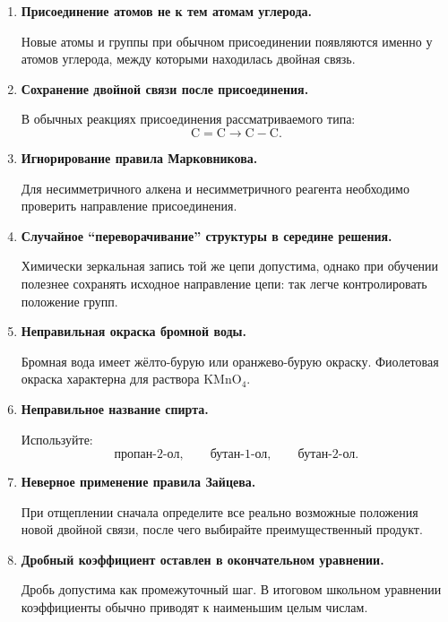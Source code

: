 \documentclass[a4paper,12pt]{article}
\newcommand{\important}[1]{\textbf{\textcolor{darkaccent}{#1}}}
\begin{document}
\begin{enumerate}
    \item \important{Присоединение атомов не к тем атомам углерода.}

    Новые атомы и группы при обычном присоединении появляются именно у атомов углерода, между которыми находилась двойная связь.

    \item \important{Сохранение двойной связи после присоединения.}

    В обычных реакциях присоединения рассматриваемого типа:
    \[
    \mathrm{C=C}\longrightarrow\mathrm{C-C}.
    \]

    \item \important{Игнорирование правила Марковникова.}

    Для несимметричного алкена и несимметричного реагента необходимо проверить направление присоединения.

    \item \important{Случайное ``переворачивание'' структуры в середине решения.}

    Химически зеркальная запись той же цепи допустима, однако при обучении полезнее сохранять исходное направление цепи: так легче контролировать положение групп.

    \item \important{Неправильная окраска бромной воды.}

    Бромная вода имеет жёлто-бурую или оранжево-бурую окраску. Фиолетовая окраска характерна для раствора \(\mathrm{KMnO_4}\).

    \item \important{Неправильное название спирта.}

    Используйте:
    \[
    \text{пропан-2-ол},\qquad
    \text{бутан-1-ол},\qquad
    \text{бутан-2-ол}.
    \]

    \item \important{Неверное применение правила Зайцева.}

    При отщеплении сначала определите все реально возможные положения новой двойной связи, после чего выбирайте преимущественный продукт.

    \item \important{Дробный коэффициент оставлен в окончательном уравнении.}

    Дробь допустима как промежуточный шаг. В итоговом школьном уравнении коэффициенты обычно приводят к наименьшим целым числам.
\end{enumerate}
\end{document}

